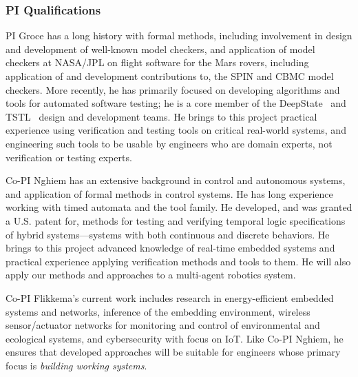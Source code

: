 \subsubsection{PI Qualifications}

PI Groce has a long history with formal methods, including involvement in design and development of well-known model checkers, and application of model checkers at NASA/JPL on flight software for the Mars rovers, including application of and development contributions to, the SPIN and CBMC model checkers.  More recently, he has primarily focused on developing algorithms and tools for automated software testing; he is a core member of the DeepState~\cite{DeepState,deepstatetutorial,deepstaterepo} and TSTL~\cite{tstlsttt} design and development teams.  He brings to this project practical experience using verification and testing tools on critical real-world systems, and engineering such tools to be usable by engineers who are domain experts, not verification or testing experts.

Co-PI Nghiem has an extensive background in control and autonomous systems, and application of formal methods in control systems.
He has long experience working with timed automata and the \uppaal tool family.
He developed, and was granted a U.S. patent for, methods for testing and verifying temporal logic specifications of hybrid systems---systems with both continuous and discrete behaviors.
He brings to this project advanced knowledge of real-time embedded systems and practical experience applying verification methods and tools to them.
He will also
apply our methods and approaches to a multi-agent robotics system.

Co-PI Flikkema's current work includes research in energy-efficient embedded systems and networks, inference of the embedding environment, wireless sensor/actuator networks for monitoring and control of environmental and ecological systems, and cybersecurity with focus on IoT.  Like Co-PI Nghiem, he ensures that developed approaches will be suitable for engineers whose primary focus is \emph{building working systems}.
